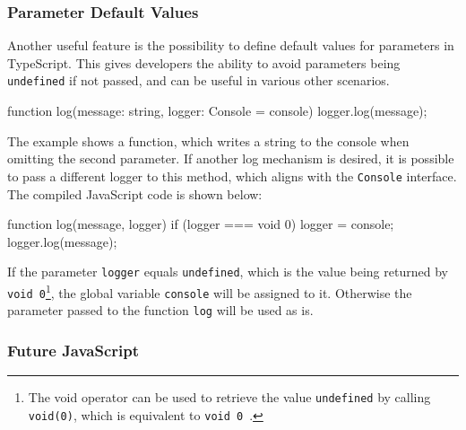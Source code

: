 \subsubsection{Parameter Default Values}

Another useful feature is the possibility to define default values for parameters in TypeScript. This gives developers the ability to avoid parameters being \texttt{undefined} if not passed, and can be useful in various other scenarios.
\begin{JsCode}[numbers=none]
function log(message: string, logger: Console = console) {
  logger.log(message);
}
\end{JsCode}
The example shows a function, which writes a string to the console when omitting the second parameter. If another log mechanism is desired, it is possible to pass a different logger to this method, which aligns with the \texttt{Console} interface. The compiled JavaScript code is shown below:
\begin{JsCode}[numbers=none]
function log(message, logger) {
    if (logger === void 0) { logger = console; }
    logger.log(message);
}
\end{JsCode}
If the parameter \texttt{logger} equals \texttt{undefined}, which is the value being returned by \texttt{void 0}\footnote{The void operator can be used to retrieve the value \texttt{undefined} by calling \texttt{void(0)}, which is equivalent to \texttt{void 0}~\cite{void:MDN:2017}.}, the global variable \texttt{console} will be assigned to it. Otherwise the parameter passed to the function \texttt{log} will be used as is.


\subsubsection{Future JavaScript}

